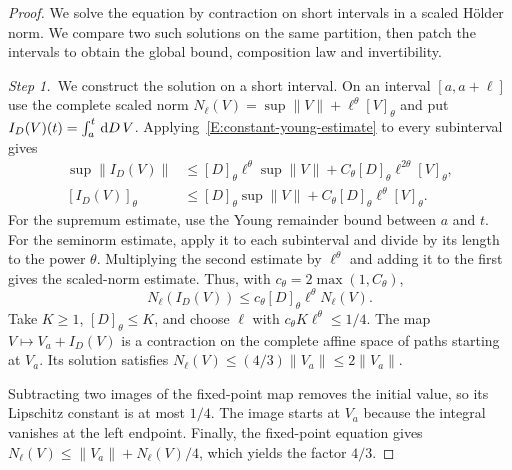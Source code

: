 \begin{proof}
  We solve the equation by contraction on short intervals in a scaled Hölder
  norm. We compare two such solutions on the same partition, then patch the
  intervals to obtain the global bound, composition law and invertibility.

  \medskip
  \noindent\textit{Step 1.~}We construct the solution on a short interval.
  On an interval $[a,a+\ell]$ use the complete scaled norm $N_\ell(V) =
  \sup\|V\|+\ell^\theta[V]_\theta$ and put $I_D(V)(t) = \int_a^t\,\mathrm{d} D\,V$.
  Applying~\eqref{E:constant-young-estimate} to every subinterval gives
  \begin{align*}
    \sup\|I_D(V)\|
    &\le[D]_\theta\ell^\theta\sup\|V\|
    +C_\theta[D]_\theta\ell^{2\theta}[V]_\theta,\\
    [I_D(V)]_\theta
    &\le[D]_\theta\sup\|V\|
    +C_\theta[D]_\theta\ell^\theta[V]_\theta.
  \end{align*}
  For the supremum estimate, use the Young remainder bound between $a$ and
  $t$. For the seminorm estimate, apply it to each subinterval and divide by
  its length to the power $\theta$. Multiplying the second estimate by
  $\ell^\theta$ and adding it to the first gives the scaled-norm estimate.
  Thus, with $c_\theta = 2\max(1,C_\theta)$,
  \begin{equation}\label{E:constant-young-local}
    N_\ell(I_D(V))
    \le c_\theta[D]_\theta\ell^\theta N_\ell(V).
  \end{equation}
  Take $K \ge 1$, $[D]_\theta \le K$, and choose $\ell$ with $c_\theta
  K\ell^\theta \le 1/4$. The map $V\mapsto V_a+I_D(V)$ is a contraction on the
  complete affine space of paths starting at $V_a$. Its solution satisfies
  $N_\ell(V) \le (4/3)\|V_a\| \le 2\|V_a\|$.

  Subtracting two images of the fixed-point map removes the initial value, so
  its Lipschitz constant is at most $1/4$. The image starts at $V_a$ because
  the integral vanishes at the left endpoint. Finally, the fixed-point
  equation gives $N_\ell(V) \le \|V_a\|+N_\ell(V)/4$, which yields the factor
  $4/3$.


\end{proof}
